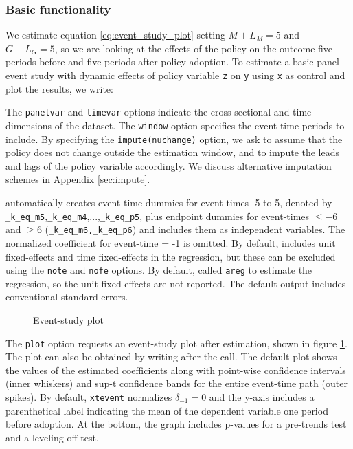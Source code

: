 \documentclass[bib]{./sty/statapress}
\begin{document}
\subsubsection*{Basic functionality}

We estimate equation \eqref{eq:event_study_plot} setting $M + L_M = 5$ and $G + L_G = 5$, so we are looking at the effects of the policy on the outcome five periods before and five periods after policy adoption.
To estimate a basic panel event study with dynamic effects of policy variable \texttt{z} on \texttt{y} using \texttt{x} as control and plot the results, we write:

\begin{stlog}
\nullskip
\end{stlog}

The \texttt{panelvar} and \texttt{timevar} options indicate the cross-sectional and time dimensions of the dataset.
The \texttt{window} option specifies the event-time periods to include.
By specifying the \texttt{impute(nuchange)} option, we ask \xtevent to assume that the policy does not change outside the estimation window, and to impute the leads and lags of the policy variable accordingly.
We discuss alternative imputation schemes in Appendix \ref{sec:impute}.

\xtevent automatically creates event-time dummies for event-times -5 to 5, denoted by \texttt{\_k\_eq\_m5},\texttt{\_k\_eq\_m4},...,\texttt{\_k\_eq\_p5}, plus endpoint dummies for event-times $\leq -6$ and $\geq 6$ (\texttt{\_k\_eq\_m6,\_k\_eq\_p6}) and includes them as independent variables.
The normalized coefficient for event-time = -1 is omitted.
By default, \xtevent includes unit fixed-effects and time fixed-effects in the regression, but these can be excluded using the \texttt{note} and \texttt{nofe} options.
By default, \xtevent called \texttt{areg} to estimate the regression, so the unit fixed-effects are not reported.
The default output includes conventional standard errors.

\begin{figure}[h!]
\begin{center}
\end{center}
\caption{Event-study plot}
\label{fig:graph_from_plot_option}
\end{figure}

The \texttt{plot} option requests an event-study plot after estimation, shown in figure \ref{fig:graph_from_plot_option}.
The plot can also be obtained by writing \xteventplot after the \xtevent call.
The default plot shows the values of the estimated coefficients along with point-wise confidence intervals (inner whiskers) and sup-t confidence bands for the entire event-time path (outer spikes).
By default, \texttt{xtevent} normalizes $\delta_{-1}=0$ and the y-axis includes a parenthetical label indicating the mean of the dependent variable one period before adoption.
At the bottom, the graph includes p-values for a pre-trends test and a leveling-off test.
\end{document}
